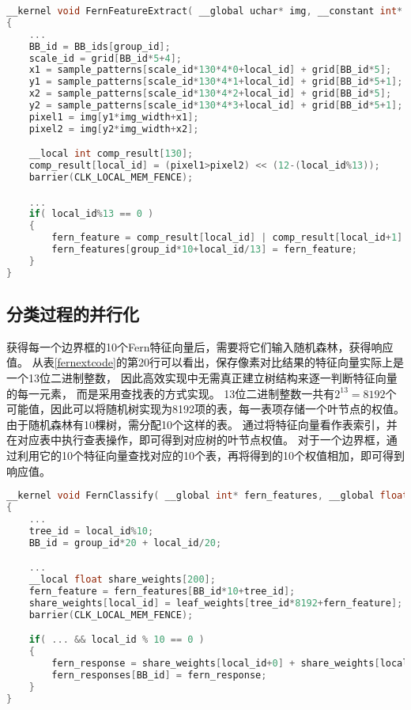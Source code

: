 \begin{table}
\caption{特征提取的Kernel程序}
\label{fernextcode}
\begin{lstlisting}[language=C++, basicstyle=\ttfamily\footnotesize]
__kernel void FernFeatureExtract( __global uchar* img, __constant int* grid, __global int* BB_ids, __constant uchar* sample_patterns, __global int* fern_features,  ... )
{
	...
	BB_id = BB_ids[group_id];
	scale_id = grid[BB_id*5+4];
	x1 = sample_patterns[scale_id*130*4*0+local_id] + grid[BB_id*5]; 
	y1 = sample_patterns[scale_id*130*4*1+local_id] + grid[BB_id*5+1]; 
	x2 = sample_patterns[scale_id*130*4*2+local_id] + grid[BB_id*5]; 
	y2 = sample_patterns[scale_id*130*4*3+local_id] + grid[BB_id*5+1]; 
	pixel1 = img[y1*img_width+x1];
	pixel2 = img[y2*img_width+x2];

	__local int comp_result[130];
	comp_result[local_id] = (pixel1>pixel2) << (12-(local_id%13));
	barrier(CLK_LOCAL_MEM_FENCE);

	...
	if( local_id%13 == 0 )
	{
		fern_feature = comp_result[local_id] | comp_result[local_id+1] | ... | comp_result[local_id+12];
		fern_features[group_id*10+local_id/13] = fern_feature;
	}
}
\end{lstlisting}
\end{table}

\subsection{分类过程的并行化}
\label{fernclassifysec}
获得每一个边界框的10个Fern特征向量后，需要将它们输入随机森林，获得响应值。
从表\ref{fernextcode}的第20行可以看出，保存像素对比结果的特征向量实际上是一个13位二进制整数，
因此高效实现中无需真正建立树结构来逐一判断特征向量的每一元素，
而是采用查找表的方式实现。
13位二进制整数一共有$2^{13}=8192$个可能值，因此可以将随机树实现为8192项的表，每一表项存储一个叶节点的权值。
由于随机森林有10棵树，需分配10个这样的表。
通过将特征向量看作表索引，并在对应表中执行查表操作，即可得到对应树的叶节点权值。
对于一个边界框，通过利用它的10个特征向量查找对应的10个表，再将得到的10个权值相加，即可得到响应值。

\begin{table}
\caption{分类过程的Kernel程序}
\label{fernclassifycode}
\begin{lstlisting}[language=C++, basicstyle=\ttfamily\footnotesize]
__kernel void FernClassify( __global int* fern_features, __global float* leaf_weights, __global float* fern_responses, ... )
{
	...
	tree_id = local_id%10;
	BB_id = group_id*20 + local_id/20;

	...
	__local float share_weights[200];	
	fern_feature = fern_features[BB_id*10+tree_id];
	share_weights[local_id] = leaf_weights[tree_id*8192+fern_feature];
	barrier(CLK_LOCAL_MEM_FENCE);

	if( ... && local_id % 10 == 0 )
	{
		fern_response = share_weights[local_id+0] + share_weights[local_id+1] + ... + share_weights[local_id+9];
		fern_responses[BB_id] = fern_response;
	}
}
\end{lstlisting}
\end{table}

